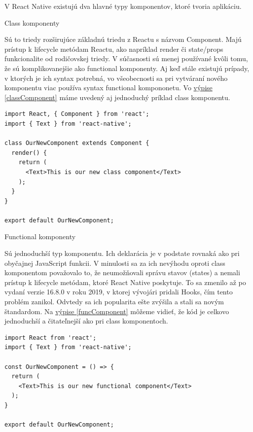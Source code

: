 V React Native existujú dva hlavné typy komponentov, ktoré tvoria aplikáciu.
\begin{itemize}[leftmargin=*]
{\bf \item Class komponenty} \newline
Sú to triedy rozširujúce základnú triedu z Reactu s názvom Component. Majú prístup k lifecycle metódam Reactu, ako napríklad render či state/props funkcionalite od rodičovskej triedy. V súčasnosti sú menej používané kvôli tomu, že sú komplikovanejšie ako functional komponenty. Aj keď stále existujú prípady, v ktorých je ich syntax potrebná, vo všeobecnosti sa pri vytváraní nového komponentu viac používa syntax functional kompononetu. Vo \hyperref[classComponent]{výpise \ref{classComponent}} máme uvedený aj jednoduchý príklad class komponentu.  \\

\begin{lstlisting}[caption={Príklad class komponentu}, label={classComponent}]
import React, { Component } from 'react';
import { Text } from 'react-native';

class OurNewComponent extends Component {
  render() {
    return (
      <Text>This is our new class component</Text>
    );
  }
}

export default OurNewComponent;
\end{lstlisting}
{\bf \item Functional komponenty} \newline
Sú jednoduchší typ komponentu. Ich deklarácia je v podstate rovnaká ako pri obyčajnej JavaScript funkcii. V minulosti sa za ich nevýhodu oproti class komponentom považovalo to, že neumožňovali správu stavov (states) a nemali prístup k lifecycle metódam, ktoré React Native poskytuje. To sa zmenilo až po vydaní verzie 16.8.0 v roku 2019, v ktorej vývojári pridali Hooks, čím tento problém zanikol. \cite{hooks} Odvtedy sa ich popularita ešte zvýšila a stali sa novým štandardom. Na \hyperref[funcComponent]{výpise \ref{funcComponent}} môžeme vidieť, že kód je celkovo jednoduchší a čitateľnejší ako pri class komponentoch. \\

\begin{lstlisting}[caption={Príklad function komponentu}, label={funcComponent}]
import React from 'react';
import { Text } from 'react-native';

const OurNewComponent = () => {
  return (
    <Text>This is our new functional component</Text>
  );
}

export default OurNewComponent;
\end{lstlisting}

\end{itemize}

